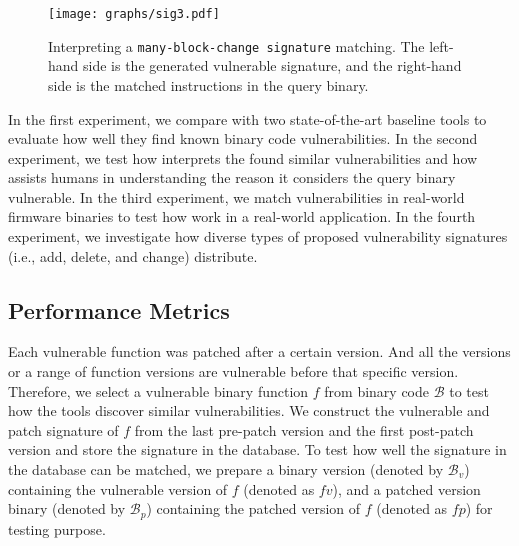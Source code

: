 \begin{figure}[!t]
\centering
\texttt{[image: graphs/sig3.pdf]}
\caption{Interpreting a \texttt{many-block-change signature} matching. The left-hand side is the generated vulnerable signature, and the right-hand side is the matched instructions in the query binary.}
\label{fig:sig3}
\end{figure}


In the first experiment, we compare \name with two state-of-the-art baseline tools to evaluate how well they find known binary code vulnerabilities.
In the second experiment, we test how \name interprets the found similar vulnerabilities and how \name assists humans in understanding the reason it considers the query binary vulnerable. 
In the third experiment, we match vulnerabilities in real-world firmware binaries to test how \name work in a real-world application.
In the fourth experiment, we investigate how diverse types of proposed vulnerability signatures (i.e., add, delete, and change) distribute.


\subsection{Performance Metrics}

Each vulnerable function was patched after a certain version. 
And all the versions or a range of function versions are vulnerable before that specific version.
Therefore, we select a vulnerable binary function $f$ from binary code $\mathcal{B}$ to test how the tools discover similar vulnerabilities. We construct the vulnerable and patch signature of $f$ from the last pre-patch version and the first post-patch version and store the signature in the database.
To test how well the signature in the database can be matched, we prepare a binary version (denoted by $\mathcal{B}_{v}$) containing the vulnerable version of $f$ (denoted as $fv$), and a patched version binary (denoted by $\mathcal{B}_{p}$) containing the patched version of $f$ (denoted as $fp$) for testing purpose. 



